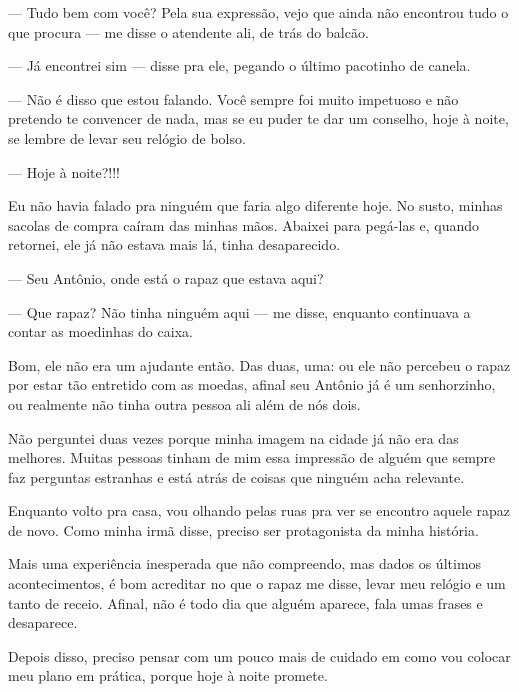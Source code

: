 — Tudo bem com você? Pela sua expressão, vejo que ainda não encontrou tudo o que procura — me disse o atendente ali, de trás do balcão.

— Já encontrei sim — disse pra ele, pegando o último pacotinho de canela.

— Não é disso que estou falando. Você sempre foi muito impetuoso e não pretendo te convencer de nada, mas se eu puder te dar um conselho, hoje à noite, se lembre de levar seu relógio de bolso.

— Hoje à noite?!!!

Eu não havia falado pra ninguém que faria algo diferente hoje. No susto, minhas sacolas de compra caíram das minhas mãos. Abaixei para pegá-las e, quando retornei, ele já não estava mais lá, tinha desaparecido.

— Seu Antônio, onde está o rapaz que estava aqui?

— Que rapaz? Não tinha ninguém aqui — me disse, enquanto continuava a contar as moedinhas do caixa.

Bom, ele não era um ajudante então. Das duas, uma: ou ele não percebeu o rapaz por estar tão entretido com as moedas, afinal seu Antônio já é um senhorzinho, ou realmente não tinha outra pessoa ali além de nós dois.

Não perguntei duas vezes porque minha imagem na cidade já não era das melhores. Muitas pessoas tinham de mim essa impressão de alguém que sempre faz perguntas estranhas e está atrás de coisas que ninguém acha relevante.

Enquanto volto pra casa, vou olhando pelas ruas pra ver se encontro aquele rapaz de novo. Como minha irmã disse, preciso ser protagonista da minha história.

Mais uma experiência inesperada que não compreendo, mas dados os últimos acontecimentos, é bom acreditar no que o rapaz me disse, levar meu relógio e um tanto de receio. Afinal, não é todo dia que alguém aparece, fala umas frases e desaparece.

Depois disso, preciso pensar com um pouco mais de cuidado em como vou colocar meu plano em prática, porque hoje à noite promete.